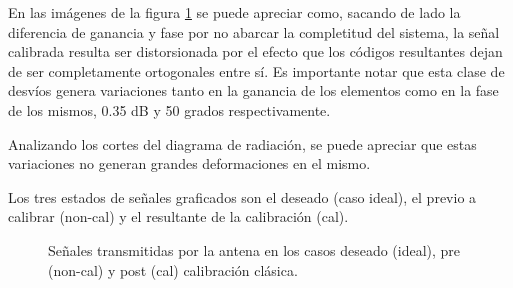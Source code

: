 En las imágenes de la figura \ref{fig:wallErrClassical0deg} se puede apreciar como, sacando de lado la diferencia de ganancia 
y fase por no abarcar la completitud del sistema, la señal calibrada resulta ser distorsionada por el efecto que los códigos 
resultantes dejan de ser completamente ortogonales entre sí. Es importante notar que esta clase de desvíos genera variaciones
tanto en la ganancia de los elementos como en la fase de los mismos, 0.35 dB y 50 grados respectivamente.

Analizando los cortes del diagrama de radiación, se puede apreciar que estas variaciones no generan grandes deformaciones en el
mismo.

Los tres estados de señales graficados son el deseado (caso ideal), el previo a calibrar (non-cal) y el resultante de la
calibración (cal).

\begin{figure}[H]
	\centering

	\caption{Señales transmitidas por la antena en los casos deseado (ideal), pre (non-cal) y post (cal) calibración clásica.}
	\label{fig:wallErrClassical0deg}
\end{figure}

